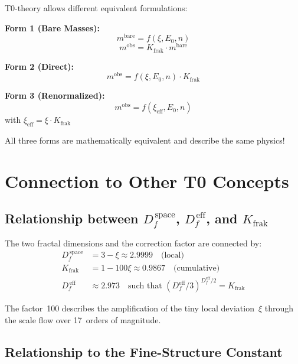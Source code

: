 	T0-theory allows different equivalent formulations:
	
	\textbf{Form 1 (Bare Masses):}
	\begin{equation}
		m^{\text{bare}} = f(\xi, E_0, n)
	\end{equation}
	\begin{equation}
		m^{\text{obs}} = K_{\text{frak}} \cdot m^{\text{bare}}
	\end{equation}
	
	\textbf{Form 2 (Direct):}
	\begin{equation}
		m^{\text{obs}} = f(\xi, E_0, n) \cdot K_{\text{frak}}
	\end{equation}
	
	\textbf{Form 3 (Renormalized):}
	\begin{equation}
		m^{\text{obs}} = f(\xi_{\text{eff}}, E_0, n)
	\end{equation}
	with $\xi_{\text{eff}} = \xi \cdot K_{\text{frak}}$
	
	All three forms are mathematically equivalent and describe the same physics!
	
	\section{Connection to Other T0 Concepts}
	
	\subsection{Relationship between $D_f^{\,\text{space}}$, $D_f^{\,\text{eff}}$, and $K_{\text{frak}}$}
	
	The two fractal dimensions and the correction factor are connected by:
	\begin{align}
		D_f^{\,\text{space}} &= 3 - \xi \approx 2.9999 \quad \text{(local)} \\
		K_{\text{frak}} &= 1 - 100\xi \approx 0.9867 \quad \text{(cumulative)} \\
		D_f^{\,\text{eff}} &\approx 2.973 \quad \text{such that } (D_f^{\text{eff}}/3)^{D_f^{\text{eff}}/2} = K_{\text{frak}}
	\end{align}
	
	The factor~100 describes the amplification of the tiny local deviation~$\xi$ through the scale flow over 17~orders of magnitude.
	
	\subsection{Relationship to the Fine-Structure Constant}
	
